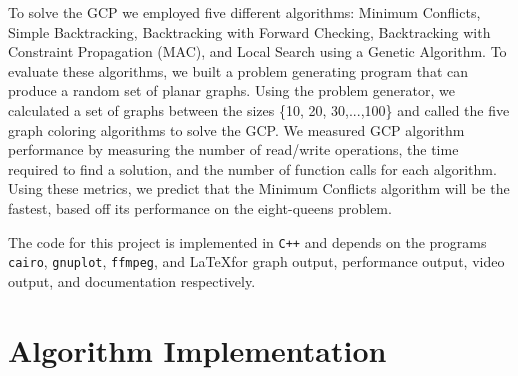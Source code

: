 \documentclass{article}
\begin{document}
	To solve the GCP we employed five different algorithms: Minimum Conflicts, Simple Backtracking, Backtracking with Forward Checking, Backtracking with Constraint Propagation (MAC), and Local Search using a Genetic Algorithm. To evaluate these algorithms, we built a problem generating program that can produce a random set of planar graphs. Using the problem generator, we calculated a set of graphs between the sizes \{10, 20, 30,...,100\} and called the five graph coloring algorithms to solve the GCP. We measured GCP algorithm performance by measuring the number of read/write operations, the time required to find a solution, and the number of function calls for each algorithm. Using these metrics, we predict that the Minimum Conflicts algorithm will be the fastest, based off its performance on the eight-queens problem\cite{ai}.


\par The code for this project is implemented in \texttt{C++} and depends on the programs \texttt{cairo}, \texttt{gnuplot}, \texttt{ffmpeg}, and \LaTeX \space for graph output, performance output, video output, and documentation respectively.

\section{Algorithm Implementation}
\end{document}
